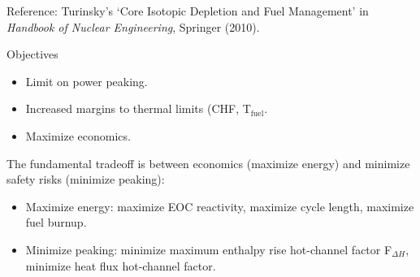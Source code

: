 \documentclass{school-22.211-notes}
\begin{document}
\clearpage
{} 


























Reference: Turinsky's `Core Isotopic Depletion and Fuel Management' in \textit{Handbook of Nuclear Engineering}, Springer (2010). 


Objectives
\begin{itemize}
\item Limit on power peaking. 
\item Increased margins to thermal limits (CHF, T$_{\mathrm{fuel}}$. 
\item Maximize economics. 
\end{itemize}
The fundamental tradeoff is between economics (maximize energy) and minimize safety risks (minimize peaking):
\begin{itemize}
\item Maximize energy: maximize EOC reactivity, maximize cycle length, maximize fuel burnup. 
\item Minimize peaking: minimize maximum enthalpy rise hot-channel factor F$_{\Delta H}$, minimize heat flux hot-channel factor. 
\end{itemize}
\end{document}
